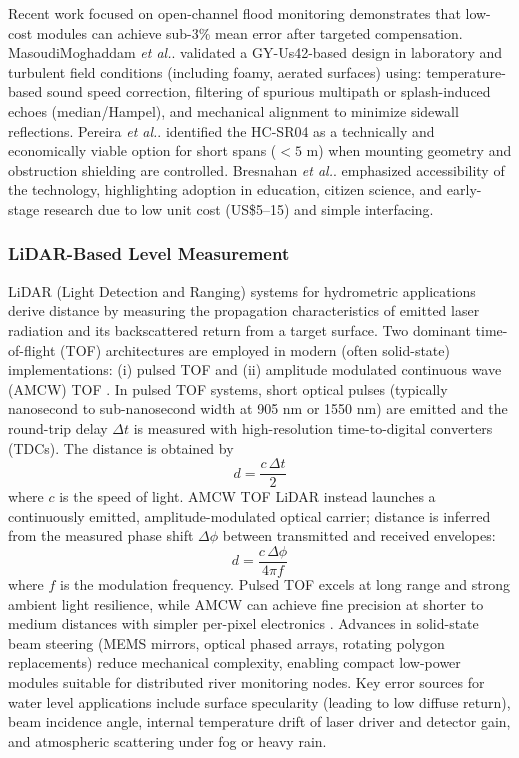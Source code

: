 \documentclass[conference]{IEEEtran}
\begin{document}
Recent work focused on open-channel flood monitoring demonstrates that low-cost modules can achieve sub-3\% mean error after targeted compensation. MasoudiMoghaddam \textit{et al.}. \cite{mohammadrezamasoudimoghaddam_2024_a} validated a GY-Us42-based design in laboratory and turbulent field conditions (including foamy, aerated surfaces) using: temperature-based sound speed correction, filtering of spurious multipath or splash-induced echoes (median/Hampel), and mechanical alignment to minimize sidewall reflections. Pereira \textit{et al.}. \cite{pereira_2022_evaluation} identified the HC-SR04 as a technically and economically viable option for short spans ($<5$ m) when mounting geometry and obstruction shielding are controlled. Bresnahan \textit{et al.}. \cite{bresnahan_2023_a} emphasized accessibility of the technology, highlighting adoption in education, citizen science, and early-stage research due to low unit cost (US\$5--15) and simple interfacing.

\subsubsection{LiDAR-Based Level Measurement}
LiDAR (Light Detection and Ranging) systems for hydrometric applications derive distance by measuring the propagation characteristics of emitted laser radiation and its backscattered return from a target surface. Two dominant time-of-flight (TOF) architectures are employed in modern (often solid-state) implementations: (i) pulsed TOF and (ii) amplitude modulated continuous wave (AMCW) TOF \cite{li_2022_a}. In pulsed TOF systems, short optical pulses (typically nanosecond to sub-nanosecond width at 905 nm or 1550 nm) are emitted and the round-trip delay \(\Delta t\) is measured with high-resolution time-to-digital converters (TDCs). The distance is obtained by
\begin{equation}
    d = \frac{c\,\Delta t}{2}
\end{equation}
where \(c\) is the speed of light. AMCW TOF LiDAR instead launches a continuously emitted, amplitude-modulated optical carrier; distance is inferred from the measured phase shift \(\Delta \phi\) between transmitted and received envelopes:
\begin{equation}
    d = \frac{c\,\Delta \phi}{4\pi f}
\end{equation}
where \(f\) is the modulation frequency. Pulsed TOF excels at long range and strong ambient light resilience, while AMCW can achieve fine precision at shorter to medium distances with simpler per-pixel electronics \cite{li_2022_a}. Advances in solid-state beam steering (MEMS mirrors, optical phased arrays, rotating polygon replacements) reduce mechanical complexity, enabling compact low-power modules suitable for distributed river monitoring nodes. Key error sources for water level applications include surface specularity (leading to low diffuse return), beam incidence angle, internal temperature drift of laser driver and detector gain, and atmospheric scattering under fog or heavy rain.
\end{document}
